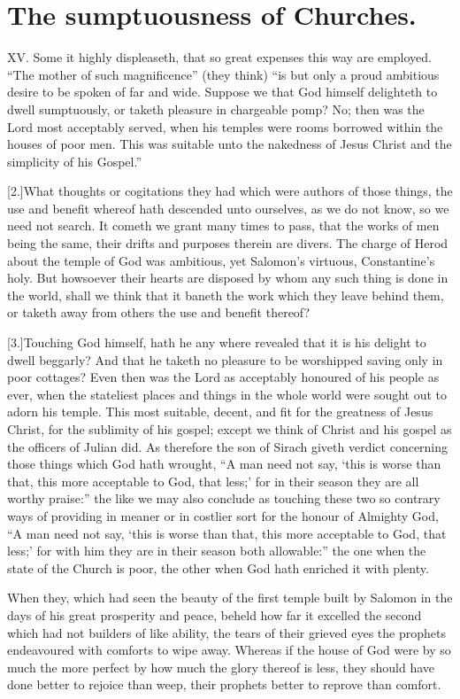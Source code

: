 \section*{The sumptuousness of Churches.}
XV. Some it highly displeaseth, that so great expenses this way are employed. “The mother of such magnificence” (they think) “is but only a proud ambitious desire to be spoken of far and wide. Suppose we that God himself delighteth to dwell sumptuously, or taketh pleasure in  chargeable pomp?
 No; then was the Lord most acceptably served, when his temples were rooms borrowed within the houses of poor men. This was suitable unto the nakedness of Jesus Christ and the simplicity of his Gospel.”

[2.]What thoughts or cogitations they had which were authors of those things, the use and benefit whereof hath descended unto ourselves, as we do not know, so we need not search. It cometh we grant many times to pass, that the works of men being the same, their drifts and purposes therein are divers. The charge of Herod about the temple of God was ambitious, yet Salomon’s virtuous, Constantine’s holy. But howsoever their hearts are disposed by whom any such thing is done in the world, shall we think that it baneth the work which they leave behind them, or taketh away from others the use and benefit thereof?

[3.]Touching God himself, hath he any where revealed that it is his delight to dwell beggarly? And that he taketh no pleasure to be worshipped saving only in poor cottages? Even then was the Lord as acceptably honoured of his people as ever, when the stateliest places and things in the whole world were sought out to adorn his temple. This most suitable, decent, and fit for the greatness of Jesus Christ, for the sublimity of his gospel; except we think of Christ and his gospel as the officers of Julian did. As therefore the son of Sirach giveth verdict concerning those things which God hath wrought, “A man need not say, ‘this is worse than that, this more acceptable to God, that less;’ for in their season they are all worthy praise:” the like we may also conclude as touching these two so contrary ways of providing in meaner or in costlier sort for the honour of Almighty God, “A man need not say, ‘this is worse than that, this more acceptable to God, that less;’ for with him they are in their season both allowable:” the one when the state of the Church is poor, the other when God hath enriched it with plenty.

When they, which had seen the beauty of the first temple  built by Salomon in the days of his great prosperity and peace, beheld how far it excelled the second which had not builders of like ability, the tears of their grieved eyes the prophets endeavoured with comforts to wipe away.
 Whereas if the house of God were by so much the more perfect by how much the glory thereof is less, they should have done better to rejoice than weep, their prophets better to reprove than comfort.

